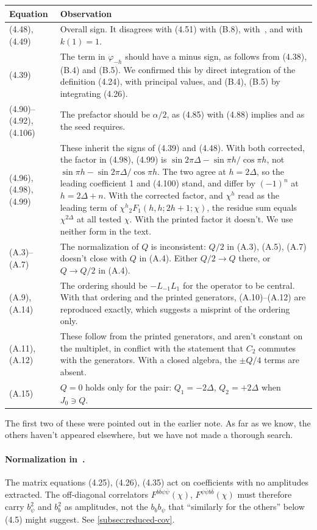 {\renewcommand{\arraystretch}{1.2}
\begin{longtable}{@{}lp{}@{}}
\toprule
Equation & Observation\\
\midrule
\endhead
(4.48), (4.49) & Overall sign. It disagrees with (4.51) with (B.8), with~\cite{Peng:2017spg}, and with $k(1)=1$.\\
(4.39) & The term in $\varphi_{-h}$ should have a minus sign, as follows from (4.38), (B.4) and (B.5). We confirmed this by direct integration of the definition (4.24), with principal values, and (B.4), (B.5) by integrating (4.26).\\
(4.90)--(4.92), (4.106) & The prefactor should be $\alpha/2$, as (4.85) with (4.88) implies and as the seed requires.\\
(4.96), (4.98), (4.99) & These inherit the signs of (4.39) and (4.48). With both corrected, the factor in (4.98), (4.99) is $\sin2\pi\Delta-\sin\pi h/\cos\pi h$, not $\sin\pi h-\sin2\pi\Delta/\cos\pi h$. The two agree at $h=2\Delta$, so the leading coefficient 1 and (4.100) stand, and differ by $(-1)^n$ at $h=2\Delta+n$. With the corrected factor, and $\chi^h$ read as the leading term of $\chi^h{}_2F_1(h,h;2h+1;\chi)$, the residue sum equals $\chi^{2\Delta}$ at all tested $\chi$. With the printed factor it doesn't. We use neither form in the text.\\
(A.3)--(A.7) & The normalization of $Q$ is inconsistent: $Q/2$ in (A.3), (A.5), (A.7) doesn't close with $Q$ in (A.4). Either $Q/2\to Q$ there, or $Q\to Q/2$ in (A.4).\\
(A.9), (A.14) & The ordering should be $-L_{-1}L_1$ for the operator to be central. With that ordering and the printed generators, (A.10)--(A.12) are reproduced exactly, which suggests a misprint of the ordering only.\\
(A.11), (A.12) & These follow from the printed generators, and aren't constant on the multiplet, in conflict with the statement that $C_2$ commutes with the generators. With a closed algebra, the $\pm Q/4$ terms are absent.\\
(A.15) & $Q=0$ holds only for the pair: $Q_1=-2\Delta$, $Q_2=+2\Delta$ when $J_0\ni Q$.\\
\bottomrule
\end{longtable}}

The first two of these were pointed out in the earlier note. As far as we know, the others haven't appeared elsewhere, but we have not made a thorough search.

\paragraph{Normalization in~\cite{Peng:2017spg}.} The matrix equations (4.25), (4.26), (4.35) act on coefficients with no amplitudes extracted. The off-diagonal correlators $F^{b\bar b\psi\bar\psi}(\chi)$, $F^{\psi\bar\psi b\bar b}(\chi)$ must therefore carry $b_\psi^2$ and $b_b^2$ as amplitudes, not the $b_bb_\psi$ that ``similarly for the others'' below (4.5) might suggest. See \cref{subsec:reduced-cov}.
